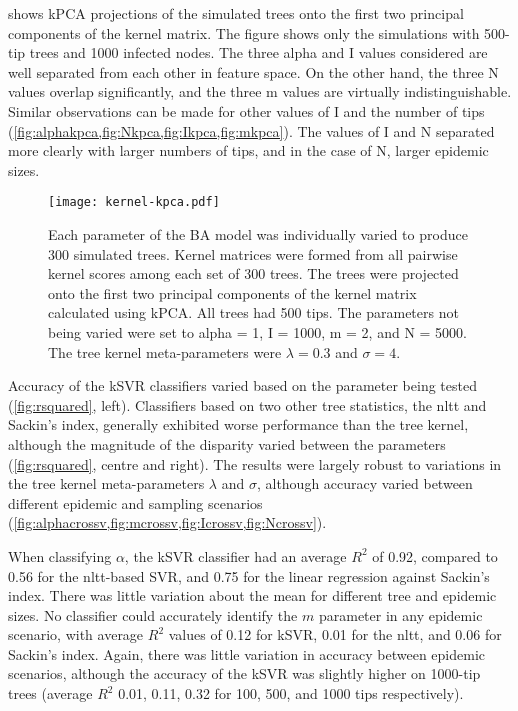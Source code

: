  shows \gls{kPCA} projections of the simulated trees onto the
first two principal components of the kernel matrix. The figure shows only the
simulations with 500-tip trees and 1000 infected nodes. The three \gls{alpha}
and \gls{I} values considered are well separated from each other in feature
space. On the other hand, the three \gls{N} values overlap significantly, and
the three \gls{m} values are virtually indistinguishable. Similar observations
can be made for other values of \gls{I} and the number of tips
(\cref{fig:alphakpca,fig:Nkpca,fig:Ikpca,fig:mkpca}). The values of \gls{I} and
\gls{N} separated more clearly with larger numbers of tips, and in the case of
\gls{N}, larger epidemic sizes.

\begin{figure}[ht]
  \centering
  \texttt{[image: kernel-kpca.pdf]}
  \caption[Kernel-PCA projections of simulated trees under varying BA
           parameter values.]{
    Each parameter of the \gls{BA} model was individually varied to produce 300
    simulated trees. Kernel matrices were formed from all pairwise kernel
    scores among each set of 300 trees. The trees were projected onto the first
    two principal components of the kernel matrix calculated using \gls{kPCA}.
    All trees had 500 tips. The parameters not being varied were set to
    \gls{alpha} = 1, \gls{I} = 1000, \gls{m} = 2, and \gls{N} = 5000. The tree
    kernel meta-parameters were $\lambda = 0.3$ and $\sigma = 4$.
  }
  \label{fig:kpca}
\end{figure}



Accuracy of the \gls{kSVR} classifiers varied based on the parameter being
tested (\cref{fig:rsquared}, left). Classifiers based on two other tree
statistics, the \gls{nltt} and Sackin's index, generally exhibited worse
performance than the tree kernel, although the magnitude of the disparity
varied between the parameters (\cref{fig:rsquared}, centre and right). The
results were largely robust to variations in the tree kernel meta-parameters
$\lambda$ and $\sigma$, although accuracy varied between different epidemic and
sampling scenarios
(\cref{fig:alphacrossv,fig:mcrossv,fig:Icrossv,fig:Ncrossv}).

When classifying $\alpha$, the \gls{kSVR} classifier had an average $R^2$ of 
    0.92,
compared to 
    0.56
for the \gls{nltt}-based SVR, and
    0.75
for the linear regression against Sackin's index. There was little variation
about the mean for different tree and epidemic sizes. No classifier could
accurately identify the $m$ parameter in any epidemic scenario, with average
$R^2$ values of 
  0.12 for \gls{kSVR},
  0.01 for the \gls{nltt}, and
  0.06
for Sackin's index. Again, there was little variation in accuracy between
epidemic scenarios, although the accuracy of the \gls{kSVR} was slightly higher
on 1000-tip trees 
    (average $R^2$ 
     0.01,
     0.11,
     0.32
     for 100, 500, and 1000 tips respectively).

